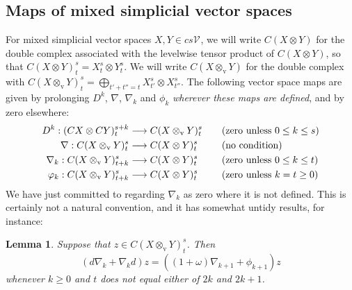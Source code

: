 \documentclass[11pt]{amsart} \renewcommand{\baselinestretch}{1.2}
\theoremstyle{plain}
\newtheorem{lem}[thm]{Lemma}
\numberwithin{equation}{section} %
\theoremstyle{plain}
\newtheorem{lem}[thm]{Lemma}
\numberwithin{equation}{chapter} %
\let\oldphi\phi
\let\phi\varphi
\renewcommand{\to}{\longrightarrow}
\newcommand{\calV}{\mathcal{V}}
\newcommand{\vect}[2]{\calV^{#1}_{#2}}
\newcommand{\twist}{\omega}
\newcommand{\Nabla}{\nabla}
\newcommand{\dver}{_\mathrm{v}}
\newcommand{\SubsectionOrSection}[1]{\subsection{#1}}
\begin{document}
\begin{second quadrant homotopy sseq operations}
\SubsectionOrSection{Maps of mixed simplicial vector spaces}

For mixed simplicial vector spaces $X,Y\in cs\vect{}{}$, we will write $C(X\otimes Y)$ for the double complex associated with the levelwise tensor product of $C(X\otimes Y)$, so that $C(X\otimes Y)_t^s=X_t^s\otimes Y_t^s$. We will write $C(X\otimes\dver Y)$ for the double complex with $C(X\otimes\dver Y)_t^s=\bigoplus_{t'+t''=t}X_{t'}^s\otimes X_{t''}^s$. The following vector space maps are given by prolonging $D^k$, $\Nabla$, $\Nabla_k$ and $\oldphi_k$ \emph{wherever these maps are defined}, and by zero elsewhere:
\begin{align*}
{D}^k:(CX\otimes CY)^{s+k}_{t}&\to C(X\otimes\dver Y)^{s}_{t}&\quad&\textup{(zero unless $0\leq k\leq s$)}\\
{\Nabla}:C(X\otimes\dver  Y)^{s}_{t}&\to C(X\otimes Y)^{s}_{t}&&\textup{(no condition)}\\
{\Nabla}_k:C(X\otimes\dver Y)^{s}_{t+k}&\to C(X\otimes Y)^{s}_{t}&\quad&\textup{(zero unless $0\leq k\leq t$)}\\
{\oldphi}_k:C(X\otimes\dver Y)^{s}_{t+k}&\to C(X\otimes Y)^{s}_{t}&\quad&\textup{(zero unless $k= t\geq0$)}
\end{align*}
We have just committed to regarding $\Nabla_k$ as zero where it is not defined. This is certainly not a natural convention,  and it has somewhat untidy results, for instance:
\begin{lem}
\label{unpleasant formula}
Suppose that $z\in C(X\otimes\dver Y)^{s}_{t}$. Then
\[(d\Nabla_k+\Nabla_kd)z=((1+\twist)\Nabla_{k+1}+\oldphi_{k+1} )z\]
whenever $k\geq0$ and $t$ does not equal either of $2k$ and $2k+1$.
\end{lem}
\noindent 


\end{second quadrant homotopy sseq operations}
\end{document}
